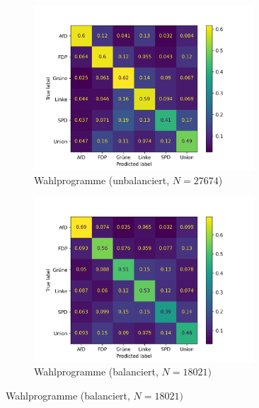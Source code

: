 \begin{figure}[H]
    \begin{subfigure}{0.5\textwidth}
      \centering
      \includegraphics[width=0.9\textwidth]{data/images/modeling/baseline/none/party_programs_confusion_matrix.png}
      \caption{Wahlprogramme (unbalanciert, \(N=\num{27674}\))} \label{sfig:confusionMatrixBaselineManifest}
    \end{subfigure}
    \begin{subfigure}{0.5\textwidth}
      \centering
      \includegraphics[width=0.9\textwidth]{data/images/modeling/baseline/under/party_programs_confusion_matrix.png}
      \caption{Wahlprogramme (balanciert, \(N=\num{18021})\)} \label{sfig:confusionMatrixBaselineManifestBalanced}
    \end{subfigure}
    

\end{figure}
